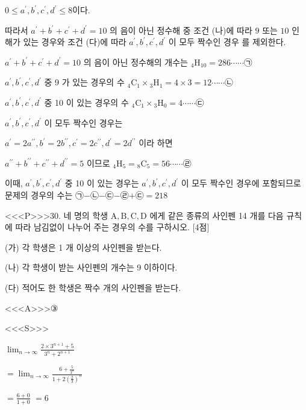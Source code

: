 \documentclass{oblivoir}
\begin{document}
$0 \leq a^{\prime}, b^{\prime}, c^{\prime}, d^{\prime} \leq 8 $이다.

따라서 $a^{\prime}+b^{\prime}+c^{\prime}+d^{\prime}=10$ 의 음이 아닌 정수해 중 조건 (나)에 따라 $9$ 또는 $10$ 인 해가 있는 경우와 조건 (다)에 따라 $a^{\prime}, b^{\prime}, c^{\prime}, d^{\prime}$ 이 모두 짝수인 경우 를 제외한다.

$a^{\prime}+b^{\prime}+c^{\prime}+d^{\prime}=10$ 의 음이 아닌 정수해의 개수는
${ }_{4} \mathrm{H}_{10}=286 \cdots \cdots $㉠

$a^{\prime}, b^{\prime}, c^{\prime}, d^{\prime}$ 중 9 가 있는 경우의 수
${ }_{4} \mathrm{C}_{1} \times{ }_{3} \mathrm{H}_{1}=4 \times 3=12 \cdots \cdots $㉡

$a^{\prime}, b^{\prime}, c^{\prime}, d^{\prime}$ 중 10 이 있는 경우의 수
${ }_{4} \mathrm{C}_{1} \times{ }_{3} \mathrm{H}_{0}=4 \cdots \cdots $㉢

$a^{\prime}, b^{\prime}, c^{\prime}, d^{\prime}$ 이 모두 짝수인 경우는

$a^{\prime}=2 a^{\prime \prime}, b^{\prime}=2 b^{\prime \prime}, c^{\prime}=2 c^{\prime \prime}, d^{\prime}=2 d^{\prime \prime}$ 이라 하면

$a^{\prime \prime}+b^{\prime \prime}+c^{\prime \prime}+d^{\prime \prime}=5 $ 이므로
${ }_{4} \mathrm{H}_{5}={ }_{8} \mathrm{C}_{5}=56 \cdots \cdots $㉣

이때, $a^{\prime}, b^{\prime}, c^{\prime}, d^{\prime}$ 중 10 이 있는 경우는 $a^{\prime}, b^{\prime}, c^{\prime}, d^{\prime}$ 이 모두 짝수인 경우에 포함되므로 문제의 경우의 수는 ㉠$-$㉡$-$㉢$-$㉣$+$㉢$=218$


<<<P>>>30. 네 명의 학생 $\mathrm{A}, \mathrm{B}, \mathrm{C}, \mathrm{D}$ 에게 같은 종류의 사인펜 14 개를 다음 규칙에 따라 남김없이 나누어 주는 경우의 수를 구하시오. [4점]

(가) 각 학생은 1 개 이상의 사인펜을 받는다.

(나) 각 학생이 받는 사인펜의 개수는 9 이하이다.

(다) 적어도 한 학생은 짝수 개의 사인펜을 받는다.


<<<A>>>③

<<<S>>>





$\lim _{n \rightarrow \infty} \frac{2 \times 3^{n+1}+5}{3^{n}+2^{n+1}}$

$=\lim _{n \rightarrow \infty} \frac{6+\frac{5}{3^{n}}}{1+2\left(\frac{2}{3}\right)^{n}}$

$=\frac{6+0}{1+0}$
$=6$
\end{document}
